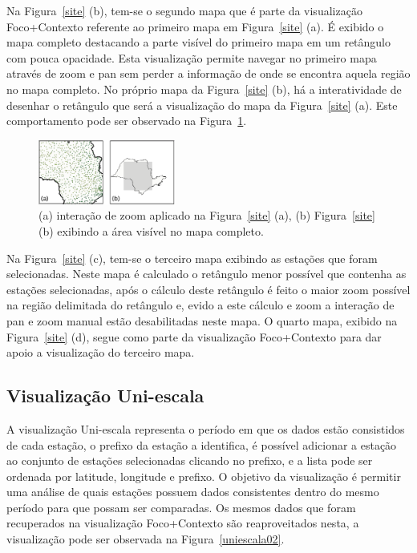 \documentclass[article,11pt,oneside,a4paper]{abntex2} %
\begin{document}
	Na Figura~\ref{site} (b), tem-se o segundo mapa que é parte da visualização Foco+Contexto referente ao primeiro mapa em Figura~\ref{site} (a). É exibido o mapa completo destacando a parte visível do primeiro mapa em um retângulo com pouca opacidade. Esta visualização permite navegar no primeiro mapa através de zoom e pan sem perder a informação de onde se encontra aquela região no mapa completo. No próprio mapa da Figura~\ref{site} (b), há a interatividade de desenhar o retângulo que será a visualização do mapa da Figura~\ref{site} (a). Este comportamento pode ser observado na Figura~\ref{mapa2}.
	
	\begin{figure}[!htb]
		\centering
		\includegraphics[width=0.4\textwidth]{figuras/mapa2_1}
		\caption{(a) interação de zoom aplicado na Figura~\ref{site} (a), (b) Figura~\ref{site} (b) exibindo a área visível no mapa completo.}
		\label{mapa2}
	\end{figure}
	
	Na Figura~\ref{site} (c), tem-se o terceiro mapa exibindo as estações que foram selecionadas. Neste mapa é calculado o retângulo menor possível que contenha as estações selecionadas, após o cálculo deste retângulo é feito o maior zoom possível na região delimitada do retângulo e, evido a este cálculo e zoom a interação de pan e zoom manual estão desabilitadas neste mapa. O quarto mapa, exibido na Figura~\ref{site} (d), segue como parte da visualização Foco+Contexto para dar apoio a visualização do terceiro mapa.
	
	\subsection{Visualização Uni-escala}
		\hspace{13pt}
	A visualização Uni-escala representa o período em que os dados estão consistidos de cada estação, o prefixo da estação a identifica, é possível adicionar a estação ao conjunto de estações selecionadas clicando no prefixo, e a lista pode ser ordenada por latitude, longitude e prefixo. O objetivo da visualização é permitir uma análise de quais estações possuem dados consistentes dentro do mesmo período para que possam ser comparadas. Os mesmos dados que foram recuperados na visualização Foco+Contexto são reaproveitados nesta, a visualização pode ser observada na Figura~\ref{uniescala02}.
	
\end{document}
